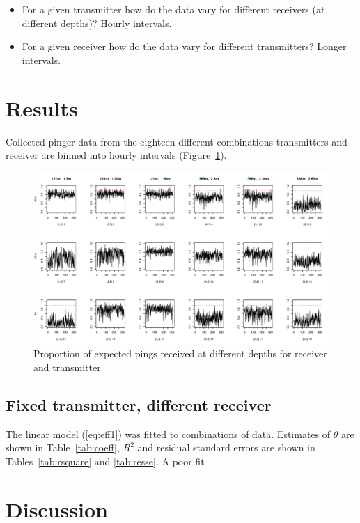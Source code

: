 \documentclass{article}
\begin{document}
\begin{itemize}
\item For a given transmitter how do the data vary for different receivers (at different depths)? Hourly intervals.
\item For a given receiver how do the data vary for different transmitters? Longer intervals.
\end{itemize}

\section{Results}
\label{sec:results}

Collected pinger data from the eighteen different combinations transmitters and receiver are binned into hourly intervals (Figure~\ref{fig:detectionpercentage}).

\begin{figure}
  \begin{center}
    \includegraphics[trim=0cm 0cm 0cm 0cm,clip,angle=0,width=1\textwidth]{detectionpercentage.pdf}
  \end{center}
  \caption{Proportion of expected pings received at different depths for receiver and transmitter.}
\label{fig:detectionpercentage}
\end{figure}

\subsection{Fixed transmitter, different receiver}

The linear model (\ref{eq:eff1}) was fitted to combinations of data. Estimates of $\theta$ are shown in Table~\ref{tab:coeff}, $R^2$ and residual standard errors are shown in Tables~\ref{tab:rsquare} and \ref{tab:resse}. A poor fit 







\section{Discussion}
\label{sec:discussion}




\end{document}
